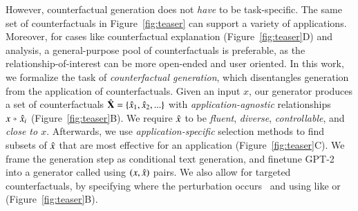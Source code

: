% 
However, counterfactual generation does not \emph{have} to be task-specific.
The same set of counterfactuals in Figure~\ref{fig:teaser} can support a variety of applications.
Moreover, for cases like counterfactual explanation (Figure~\ref{fig:teaser}D) and analysis, a general-purpose pool of counterfactuals is preferable, as the relationship-of-interest can be more open-ended and user oriented.
In this work, we formalize the task of \emph{counterfactual generation}, which disentangles generation from the application of counterfactuals.
Given an input $x$, our generator produces a set of counterfactuals $\hat{\mathbf{X}} = \{\hat{x}_1, \hat{x}_2, ...\}$ with \emph{application-agnostic} relationships $x \veryshortarrow \xp_i$ (Figure~\ref{fig:teaser}B).
We require $\hat{x}$ to be \emph{fluent}, \emph{diverse}, \emph{controllable}, and \emph{close to $x$}.
Afterwards, we use \emph{application-specific} selection methods to find subsets of $\hat{x}$ that are most effective for an application (Figure~\ref{fig:teaser}C).
We frame the generation step as conditional text generation, and finetune GPT-2~\cite{radford2019language} into a generator called \emph{\sysname} using $(x, \hat{x})$ pairs. 
We also allow for targeted counterfactuals, by specifying where the perturbation occurs~\cite{donahue2020enabling} and using \tagstrs like  or  (Figure~\ref{fig:teaser}B).

